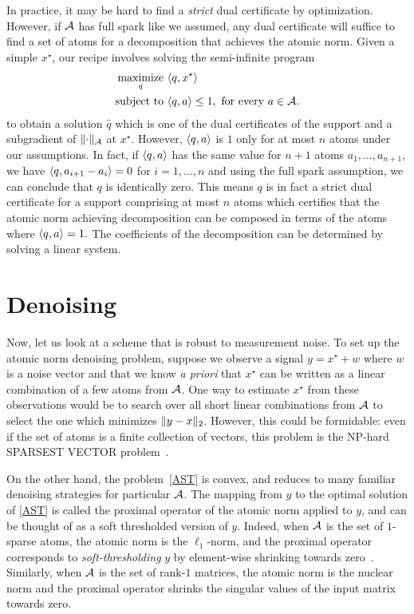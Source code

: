 In practice, it may be hard to find a \emph{strict} dual certificate by
optimization. However, if $\mathcal{A}$ has full spark like we assumed, any dual
certificate will suffice to find a set of atoms for a decomposition that
achieves the atomic norm. Given a simple $x^\star$, our recipe involves solving
the semi-infinite program
\begin{equation}
\label{eq:ast:dual:support}
\begin{split}
	\mathop{\operatorname{maximize}}_q~ & \langle q, x^\star\rangle\\
	\text{subject to } & \langle q, a\rangle \leq 1, \text{ for every } a \in \mathcal{A}.
\end{split}
\end{equation}
to obtain a solution $\hat{q}$ which is one of the dual certificates of the
support and a subgradient of $\lVert\cdot\rVert_{\mathcal{A}}$ at $x^\star$. However,
$\langle q, a\rangle$ is $1$ only for at most $n$ atoms under our assumptions. In fact,
if $\langle q, a\rangle$ has the same value for $n+1$ atoms $a_1, \dots, a_{n+1}$, we
have $\langle q, a_{i+1}-a_i\rangle = 0$ for $i=1,\ldots,n$ and using the full spark
assumption, we can conclude that $q$ is identically zero. This means $q$ is in
fact a strict dual certificate for a support comprising at most $n$ atoms which
certifies that the atomic norm achieving decomposition can be composed in terms
of the atoms where $\langle q, a\rangle=1.$ The coefficients of the decomposition can be
determined by solving a linear system.

\section{Denoising}
\label{sec:abstract-denoising}

Now, let us look at a scheme that is robust to measurement noise. To set up the
atomic norm denoising problem, suppose we observe a signal $y = x^\star + w$
where $w$ is a noise vector and that we know \emph{a priori} that $x^\star$ can
be written as a linear combination of a few atoms from $\mathcal{A}$. One way to estimate
$x^\star$ from these observations would be to search over all short linear
combinations from $\mathcal{A}$ to select the one which minimizes $\lVert y- x\rVert_2$.
However, this could be formidable: even if the set of atoms is a finite
collection of vectors, this problem is the NP-hard SPARSEST VECTOR
problem~\cite{Natarajan95}.

On the other hand, the problem~\eqref{AST} is convex, and reduces to many
familiar denoising strategies for particular $\mathcal{A}$. The mapping from $y$ to the
optimal solution of \eqref{AST} is called the proximal operator of the atomic
norm applied to $y$, and can be thought of as a soft thresholded version of $y$.
Indeed, when $\mathcal{A}$ is the set of $1$-sparse atoms, the atomic norm is the
$\ell_1$-norm, and the proximal operator corresponds to \emph{soft-thresholding}
$y$ by element-wise shrinking towards zero~\cite{donoho1995noising}. Similarly,
when $\mathcal{A}$ is the set of rank-$1$ matrices, the atomic norm is the nuclear norm
and the proximal operator shrinks the singular values of the input matrix
towards zero.

